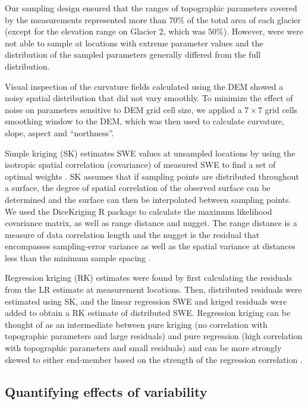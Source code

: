 \documentclass[twocolumn,letterpaper]{igs}
\begin{document}
Our sampling design ensured that the ranges of topographic parameters covered by the measurements represented more than 70\% of the total area of each glacier (except for the elevation range on Glacier 2, which was 50\%). However, were were not able to sample at locations with extreme parameter values and the distribution of the sampled parameters generally differed from the full distribution.

Visual inspection of the curvature fields calculated using the DEM showed a noisy spatial
distribution that did not vary smoothly. To minimize the effect of noise on parameters sensitive to DEM grid cell size, we applied a $7\times7$ grid cells smoothing window to the DEM, which was then used to calculate curvature, slope, aspect and ``northness''.

Simple kriging (SK) estimates SWE values at unsampled locations by using the isotropic spatial correlation (covariance) of measured SWE to find a set of optimal weights \citep{Davis1986, Li2008}. SK assumes that if sampling points are distributed throughout a surface, the degree of spatial correlation of the observed surface can be determined and the surface can then be interpolated between sampling points. We used the DiceKriging R package \citep{Roustant2012} to calculate the maximum likelihood covariance matrix, as well as range distance and nugget. The range distance is a measure of data correlation length and the nugget is the residual that encompasses sampling-error variance as well as the spatial variance at distances less than the minimum sample spacing \citep{Li2008}. 

Regression kriging (RK) \citep{Hengl2007} estimates were found by first calculating the residuals from the LR estimate at measurement locations. Then, distributed residuals were estimated using SK, and the linear regression SWE and kriged residuals were added to obtain a RK estimate of distributed SWE. Regression kriging can be thought of as an intermediate between pure kriging (no correlation with topographic parameters and large residuals) and pure regression (high correlation with topographic parameters and small residuals) and can be more strongly skewed to either end-member based on the strength of the regression correlation \citep{Hengl2007}.

\subsection{Quantifying effects of variability}
\end{document}
